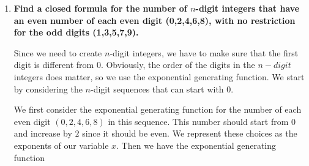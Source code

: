 \documentclass[10pt]{article}
\begin{document}
\begin{enumerate}
\begin{enumerate}
The number of ways that Dave can spray paint each square of a $1\times n$ board one of red, white, or blue so that an even number of squares are colored white ($a_n$) is the coefficient of $\frac{x^n}{n!}$ in the exponential generating function is $\frac{3^n+1}{2}$.

\item
\textbf{How many ways can Dave spray paint each square of a $2\times n$ board one of red, white, or blue so that an even number of squares are colored white?}\\
{\footnotesize \it Hint: If you think about this the right way, you should actually be able to replace the $2$ with any fixed positive integer $k$ and still easily get the answer.}

On the $2 \times n$ board, Dave can paint the $1\times 1$ square with colors. On the board, there are $2n$ $1\times 1$ squares. So the number of ways Dave can spray paint each square of a $2\times n$ board one of red, white, or blue so that an even number of squares are colored white is equal to the number of ways Dave can spray paint each square of a $1\times 2n$ board one of red, white, or blue so that an even number of squares are colored white.

Let $N=2n$. From a), we have the number of ways that Dave can spray paint each square of a $1\times N$ board one of red, white, or blue so that an even number of squares are colored white is $\frac{3^N+1}{2}=\frac{3^{2n}+1}{2}$.

\end{enumerate}

\vskip 1cm

\item
\textbf{Find a closed formula for the number of $n$-digit integers that have an even number of each {\bf even} digit (0,2,4,6,8), with no restriction for the odd digits (1,3,5,7,9).}

Since we need to create $n$-digit integers, we have to make sure that the first digit is different from $0$. Obviously, the order of the digits in the $n-digit$ integers does matter, so we use the exponential generating function. We start by considering the $n$-digit sequences that can start with $0$.

We first consider the exponential generating function for the number of each even digit $(0,2,4,6,8)$ in this sequence. This number should start from $0$ and increase by $2$ since it should be even. We represent these choices as the exponents of our variable $x$. Then we have the exponential generating function


\end{enumerate}
\end{document}
